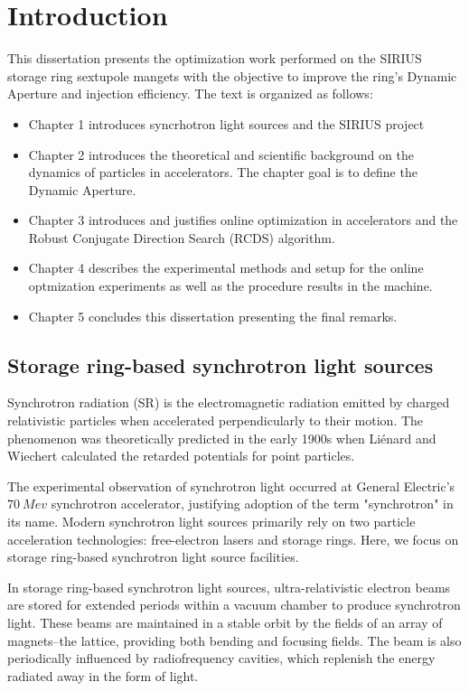 \chapter{Introduction}
This dissertation presents the optimization work performed on the SIRIUS storage ring sextupole mangets with the objective to improve the ring's Dynamic Aperture and injection efficiency. The text is organized as follows:
\begin{itemize}
    \item Chapter 1 introduces syncrhotron light sources and the SIRIUS project
    \item Chapter 2 introduces the theoretical and scientific background on the dynamics of particles in accelerators. The chapter goal is to define the Dynamic Aperture.
    \item Chapter 3 introduces and justifies online optimization in accelerators and the Robust Conjugate Direction Search (RCDS) algorithm.
    \item Chapter 4 describes the experimental methods and setup for the online optmization experiments as well as the procedure results in the machine.
    \item Chapter 5 concludes this dissertation presenting the final remarks.
\end{itemize}

\section{Storage ring-based synchrotron light sources}
Synchrotron radiation (SR) is the electromagnetic radiation emitted by charged relativistic particles when accelerated perpendicularly to their motion. The phenomenon was theoretically predicted in the early 1900s when Liénard and Wiechert calculated the retarded potentials for point particles.

The experimental observation of synchrotron light occurred at General Electric's $70~\unit{Mev}$ synchrotron accelerator, justifying adoption of the term "synchrotron" in its name. Modern synchrotron light sources primarily rely on two particle acceleration technologies: free-electron lasers and storage rings. Here, we focus on storage ring-based synchrotron light source facilities.

In storage ring-based synchrotron light sources, ultra-relativistic electron beams are stored for extended periods within a vacuum chamber to produce synchrotron light. These beams are maintained in a stable orbit by the fields of an array of magnets--the lattice, providing both bending and focusing fields. The beam is also periodically influenced by radiofrequency cavities, which replenish the energy radiated away in the form of light.

